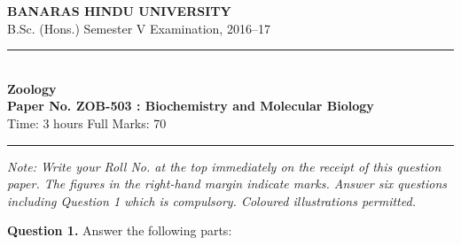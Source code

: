 \documentclass[11pt,a4paper]{article}
\begin{document}
\begin{center}
  {\large\bfseries BANARAS HINDU UNIVERSITY}\\[2pt]
  {\normalsize B.Sc. (Hons.) Semester V Examination, 2016--17}\\[6pt]
  \rule{0.8\linewidth}{0.5pt}\\[6pt]
  {\large\bfseries Zoology}\\[4pt]
  {\large\bfseries Paper No. ZOB-503 : Biochemistry and Molecular Biology}\\[4pt]
  {\normalsize Time: 3 hours \hfill Full Marks: 70}
\end{center}

\rule{\linewidth}{0.4pt}

\smallskip



\noindent   \textit{Note: Write your Roll No. at the top immediately on the receipt of this question paper. The figures in the right-hand margin indicate marks. Answer six questions including Question 1 which is compulsory. Coloured illustrations permitted.}

\bigskip



\noindent   \textbf{Question 1.} Answer the following parts:
\end{document}
